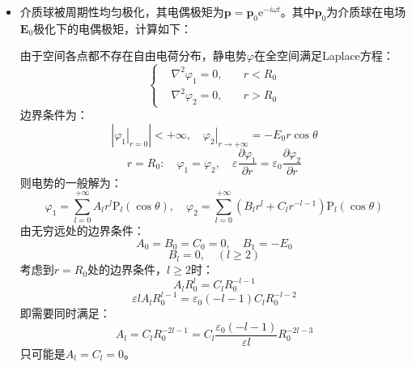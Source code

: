 \documentclass[a4paper,fontset=none]{ctexart}
\begin{document}
\begin{itemize}
        \item[13.]
        介质球被周期性均匀极化，其电偶极矩为$\bm{p}=\bm{p}_0\mathrm{e}^{-i\omega t}$。其中$\bm{p}_0$为介质球在电场$\bm{E}_0$极化下的电偶极矩，计算如下：

        由于空间各点都不存在自由电荷分布，静电势$\varphi$在全空间满足Laplace方程：
        \[
        \left\{
            \begin{aligned}
                &\nabla^2\varphi_1 = 0,\quad &r<R_0 \\
                &\nabla^2\varphi_2 = 0,\quad &r>R_0
            \end{aligned}
        \right.
        \]
        边界条件为：
        \[
            \left|\left.\varphi_1\right|_{r=0}\right| < +\infty,\quad
            \left.\varphi_2\right|_{r\to+\infty} = -E_0r\cos\theta
        \]
        \[
            r = R_0:\quad \varphi_1 = \varphi_2,\quad \varepsilon\frac{\partial\varphi_1}{\partial r} = \varepsilon_0\frac{\partial\varphi_2}{\partial r}
        \]
        则电势的一般解为：
        \[
            \varphi_1 = \sum_{l=0}^{+\infty}A_l r^l\mathrm{P}_l(\cos\theta),\quad
            \varphi_2 = \sum_{l=0}^{+\infty}(B_l r^l + C_l r^{-l-1})\mathrm{P}_l(\cos\theta)
        \]
        由无穷远处的边界条件：
        \[
            A_0 = B_0 = C_0 = 0,\quad B_1 = -E_0
        \]
        \[
            B_l = 0,\quad (l\geqslant2)
        \]
        考虑到$r=R_0$处的边界条件，$l\geqslant2$时：
        \[
            A_lR_0^l = C_lR_0^{-l-1}
        \]
        \[
            \varepsilon lA_lR_0^{l-1} = \varepsilon_0(-l-1)C_lR_0^{-l-2}
        \]
        即需要同时满足：
        \[
            A_l = C_lR_0^{-2l-1} = C_l\frac{\varepsilon_0(-l-1)}{\varepsilon l}R_0^{-2l-3}
        \]
        只可能是$A_l=C_l=0$。


\end{itemize}
\end{document}
